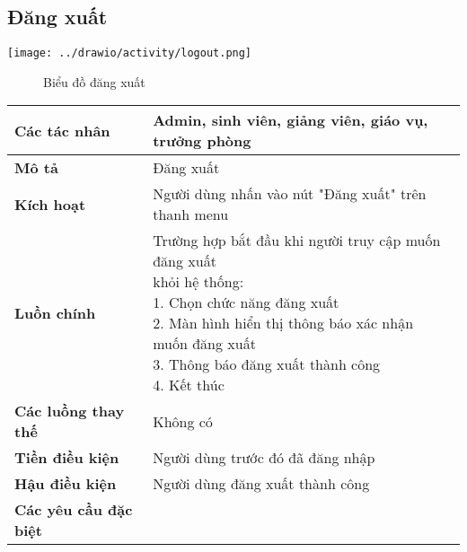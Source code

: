 \subsection{Đăng xuất}
\begin{center}
	\texttt{[image: ../drawio/activity/logout.png]}
	\begin{figure}[h]
		\centering
		\caption{Biểu đồ đăng xuất}
	\end{figure}
\end{center}
\begin{tabular}{|l|p{}|}
	\hline
	\textbf{Các tác nhân}         & Admin, sinh viên, giảng viên, giáo vụ, trưởng phòng                              \\
	\hline
	\textbf{Mô tả}                & Đăng xuất                                                                        \\
	\hline
	\textbf{Kích hoạt}            & Người dùng nhấn vào nút "Đăng xuất" trên thanh menu                              \\
	\hline
	\textbf{Luồn chính}           & \makecell[l]{Trường hợp bắt đầu khi người truy cập muốn đăng xuất \\ khỏi hệ thống: \\ 1. Chọn chức năng đăng xuất \\ 2. Màn hình hiển thị thông báo xác nhận muốn đăng xuất \\ 3. Thông báo đăng xuất thành công \\ 4. Kết thúc} \\
	\hline
	\textbf{Các luồng thay thế}   & Không có                                                                         \\
	\hline
	\textbf{Tiền điều kiện}       & Người dùng trước đó đã đăng nhập                                                 \\
	\hline
	\textbf{Hậu điều kiện}        & Người dùng đăng xuất thành công                                                  \\
	\hline
	\textbf{Các yêu cầu đặc biệt} &                                                                                  \\
	\hline
\end{tabular}

